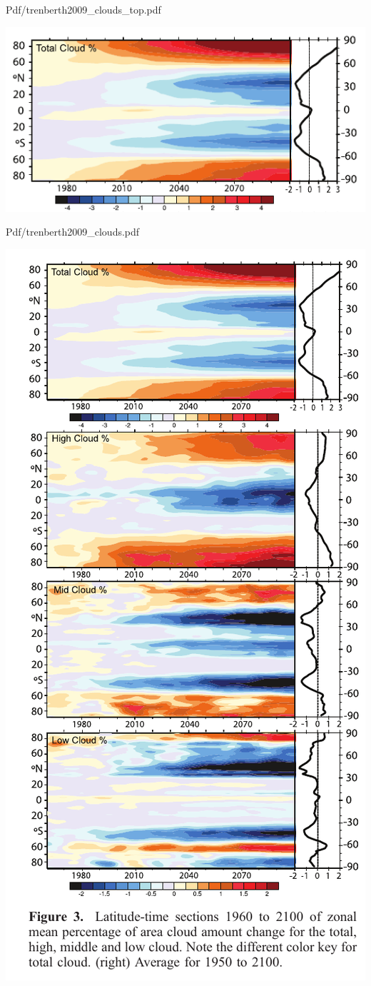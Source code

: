 \documentclass[10pt,t]{beamer}
\begin{document}
\begin{frame}[label={sec:orga906aea}]{Pdf/trenberth2009\_clouds\_top.pdf}
\begin{center}
\includegraphics[width=0.7\linewidth]{./Figs/Pdf/trenberth2009_clouds_top.pdf}
\end{center}
\end{frame}

\begin{frame}[label={sec:orgd466d0b}]{Pdf/trenberth2009\_clouds.pdf}
\begin{center}
\includegraphics[width=0.7\linewidth]{./Figs/Pdf/trenberth2009_clouds.pdf}
\end{center}
\end{frame}
\end{document}
